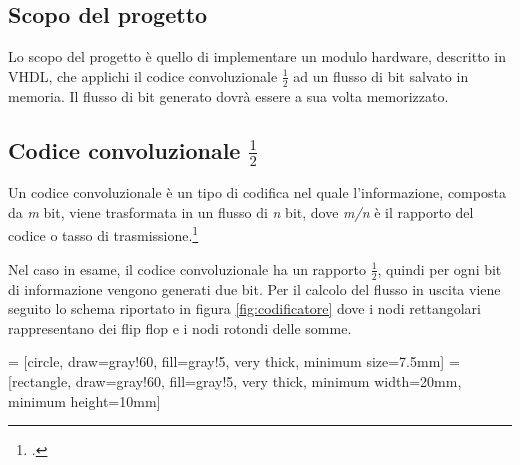 \subsection{Scopo del progetto}

Lo scopo del progetto è quello di implementare un modulo hardware, descritto in VHDL, che applichi il codice convoluzionale $\frac{1}{2}$ ad un flusso di bit salvato in memoria. Il flusso di bit generato dovrà essere a sua volta memorizzato.

\subsection{Codice convoluzionale \texorpdfstring{$\frac{1}{2}$}{}}
\label{section:convolutore}

Un codice convoluzionale è un tipo di codifica nel quale l'informazione, composta da \textit{m} bit, viene trasformata in un flusso di \textit{n} bit, dove \textit{m/n} è il rapporto del codice o tasso di trasmissione.\footcite{codiceconvoluzionale}

Nel caso in esame, il codice convoluzionale ha un rapporto $\frac{1}{2}$, quindi per ogni bit di informazione vengono generati due bit. Per il calcolo del flusso in uscita viene seguito lo schema riportato in figura \ref{fig:codificatore} dove i nodi rettangolari rappresentano dei flip flop e i nodi rotondi delle somme.

 = [circle, draw=gray!60, fill=gray!5, very thick, minimum size=7.5mm]
 = [rectangle, draw=gray!60, fill=gray!5, very thick, minimum width=20mm, minimum height=10mm]

